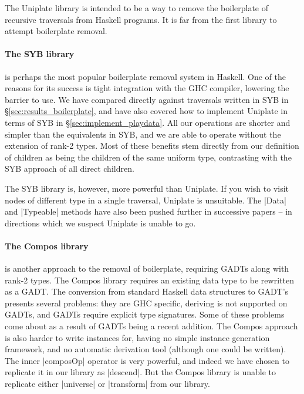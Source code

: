 \documentclass[preprint]{sigplanconf}
\begin{document}
The Uniplate library is intended to be a way to remove the boilerplate of recursive traversals from Haskell programs. It is far from the first library to attempt boilerplate removal.

\paragraph{The SYB library} \citep{lammel:syb} is perhaps the most popular boilerplate removal system in Haskell. One of the reasons for its success is tight integration with the GHC compiler, lowering the barrier to use. We have compared directly against traversals written in SYB in \S\ref{sec:results_boilerplate}, and have also covered how to implement Uniplate in terms of SYB in \S\ref{sec:implement_playdata}. All our operations are shorter and simpler than the equivalents in SYB, and we are able to operate without the extension of rank-2 types. Most of these benefits stem directly from our definition of children as being the children of the same uniform type, contrasting with the SYB approach of all direct children.

The SYB library is, however, more powerful than Uniplate. If you wish to visit nodes of different type in a single traversal, Uniplate is unsuitable. The |Data| and |Typeable| methods have also been pushed further in successive papers \citep{lammel:syb2,lammel:syb3} -- in directions which we suspect Uniplate is unable to go.

\paragraph{The Compos library} \citep{bringert:compos} is another approach to the removal of boilerplate, requiring GADTs \citep{spj:gadt} along with rank-2 types. The Compos library requires an existing data type to be rewritten as a GADT. The conversion from standard Haskell data structures to GADT's presents several problems: they are GHC specific, deriving is not supported on GADTs, and GADTs require explicit type signatures. Some of these problems come about as a result of GADTs being a recent addition. The Compos approach is also harder to write instances for, having no simple instance generation framework, and no automatic derivation tool (although one could be written). The inner |composOp| operator is very powerful, and indeed we have chosen to replicate it in our library as |descend|. But the Compos library is unable to replicate either |universe| or |transform| from our library.
\end{document}
